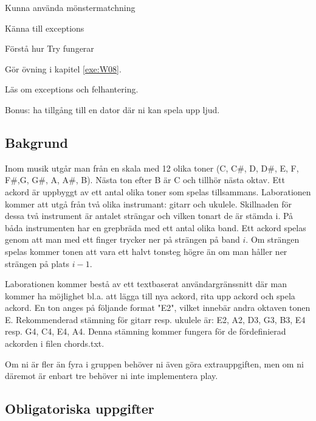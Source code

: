 

\Lab{\LabWeekEIGHT}

\begin{Goals}
\item Kunna använda mönstermatchning
\item Känna till exceptions
\item Förstå hur Try fungerar

\end{Goals}

\begin{Preparations}
\item Gör övning {\tt \ExeWeekEIGHT} i kapitel \ref{exe:W08}.
\item Läs om exceptions och felhantering.
\item Bonus: ha tillgång till en dator där ni kan spela upp ljud.
\end{Preparations}

\subsection{Bakgrund}
Inom musik utgår man från en skala med 12 olika toner (C, C\#, D, D\#, E, F, F\#,G, G\#, A, A\#, B). Nästa ton efter B är C och tillhör nästa oktav. Ett ackord är uppbyggt av ett antal olika toner som spelas tillsammans. Laborationen kommer att utgå från två olika instrumant: gitarr och ukulele. Skillnaden för dessa två instrument är antalet strängar och vilken tonart de är stämda i. På båda instrumenten har en grepbräda med ett antal olika band. Ett ackord spelas genom att man med ett finger trycker ner på strängen på band $i$. Om strängen spelas kommer tonen att vara ett halvt tonsteg högre än om man håller ner strängen på plats $i-1$.

Laborationen kommer bestå av ett textbaserat användargränssnitt där man kommer ha möjlighet bl.a. att lägga till nya ackord, rita upp ackord och spela ackord. En ton anges på följande format "E2", vilket innebär andra oktaven tonen E. Rekommenderad stämning för gitarr resp. ukulele är: E2, A2, D3, G3, B3, E4 resp. G4, C4, E4, A4. Denna stämning kommer fungera för de fördefinierad ackorden i filen chords.txt.

Om ni är fler än fyra i gruppen behöver ni även göra extrauppgiften, men om ni däremot är enbart tre behöver ni inte implementera play.

\subsection{Obligatoriska uppgifter}

